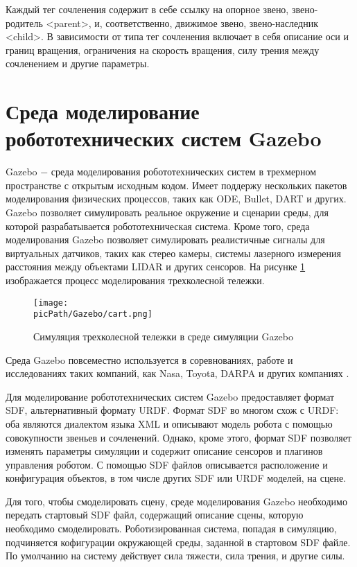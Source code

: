 \documentclass[oneside,final,14pt]{extreport}
\newcommand{\picPath}{img}
\begin{document}
Каждый тег сочленения содержит в себе ссылку на опорное звено, звено-родитель <parent>, и, соответственно, движимое звено, звено-наследник <child>.  В зависимости от типа тег сочленения включает в себя описание оси и границ вращения, ограничения на скорость вращения, силу трения между сочленением и другие параметры\cite{ros.org}. 

\section{Среда моделирование робототехнических систем Gazebo}
\label{chap:Gazebo}
Gazebo $-$ среда моделирования робототехнических систем в трехмерном пространстве с открытым исходным кодом. Имеет поддержу нескольких пакетов моделирования физических процессов, таких как ODE, Bullet, DART и других. Gazebo позволяет симулировать реальное окружение и сценарии среды, для которой разрабатывается робототехническая система. Кроме того, среда моделирования Gazebo позволяет симулировать реалистичные сигналы для виртуальных датчиков, таких как стерео камеры, системы лазерного измерения расстояния между объектами LIDAR и других сенсоров.
На рисунке \ref{Figure:gazeboEx} изображается процесс моделирования трехколесной тележки. 

\begin{figure}[H]
\begin{center}
\texttt{[image: \\picPath/Gazebo/cart.png]}
\end{center}
  \caption{ Симуляция трехколесной тележки в среде симуляции Gazebo}
  \label{Figure:gazeboEx}
\end{figure}

Среда Gazebo повсеместно используется в соревнованиях, работе и исследованиях таких компаний, как Nasa, Toyotа, DARPA и других компаниях \cite{gazebosim.org}. 

Для моделирование робототехнических систем Gazebo предоставляет формат SDF, альтернативный формату URDF. Формат SDF во многом схож с URDF: оба  являются диалектом языка XML и описывают модель робота с помощью  совокупности звеньев и сочленений. Однако, кроме этого, формат SDF позволяет изменять параметры симуляции и содержит описание сенсоров и плагинов управления роботом. С помощью SDF файлов описывается расположение и конфигурация объектов, в том числе других SDF или URDF моделей, на сцене. 

Для того, чтобы смоделировать сцену, среде моделирования Gazebo необходимо передать стартовый SDF файл, содержащий описание сцены, которую необходимо смоделировать. Роботизированная система, попадая в симуляцию, подчиняется кофигурации окружающей среды, заданной в стартовом SDF файле. По умолчанию на систему действует сила тяжести, сила трения, и другие силы. 
\end{document}
